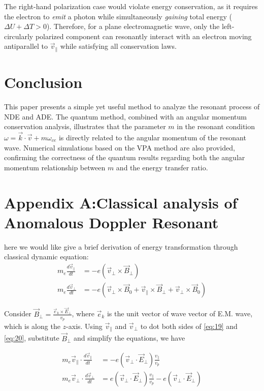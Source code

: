 \documentclass{cpbtex3}
\begin{document}
The right-hand polarization case would violate energy conservation, as it requires the electron to \emph{emit} a photon while simultaneously \emph{gaining} total energy ($\Delta U + \Delta T > 0$). 
Therefore, for a plane electromagnetic wave, only the left-circularly polarized component can resonantly interact with an electron moving antiparallel to $\vec{v}_{\parallel}$ while satisfying all conservation laws.



\section{Conclusion}
This paper presents a simple yet useful method to analyze the resonant process of NDE and ADE. The quantum method, combined with an angular momentum conservation analysis, illustrates that the parameter $m$ in the resonant condition $\omega = \vec{k} \cdot \vec{v} + m\omega_{ce}$ is directly related to the angular momentum of the resonant wave. Numerical simulations based on the VPA method are also provided, confirming the correctness of the quantum results regarding both the angular momentum relationship between $m$ and the energy transfer ratio.

\section*{Appendix A:Classical analysis of Anomalous Doppler Resonant}
here we would like give a brief derivation of energy transformation through classical dynamic equation:
\begin{align}
m_e \frac{d\vec{v}_\parallel}{dt} &= -e(\vec{v}_\perp \times \vec{B}_\perp) \label{eq:19} \\
m_e \frac{d\vec{v}_\perp}{dt} &= -e(\vec{v}_\perp \times \vec{B}_0 + \vec{v}_\parallel \times \vec{B}_\perp + \vec{v}_\perp \times \vec{B}_0) \label{eq:20}
\end{align}

Consider $\vec{B}_\perp = \frac{\vec{e}_k \times \vec{E}_\perp}{v_p}$, where $\vec{e}_k$ is the unit vector of wave vector of E.M. wave, which is along the $z$-axis. Using $\vec{v}_\parallel$ and $\vec{v}_\perp$ to dot both sides of \eqref{eq:19} and \eqref{eq:20}, substitute $\vec{B}_\perp$ and simplify the equations, we have

\begin{align}
m_e \vec{v}_\parallel \cdot \frac{d\vec{v}_\parallel}{dt} &= -e(\vec{v}_\perp \cdot \vec{E}_\perp) \frac{v_\parallel}{v_p} \label{eq:21} \\
m_e \vec{v}_\perp \cdot \frac{d\vec{v}_\perp}{dt} &= e(\vec{v}_\perp \cdot \vec{E}_\perp) \frac{v_\parallel}{v_p} - e(\vec{v}_\perp \cdot \vec{E}_\perp) \label{eq:22}
\end{align}
\end{document}
